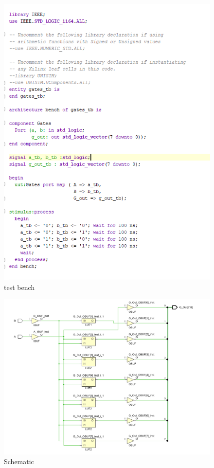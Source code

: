 \documentclass{article}
\begin{document}
\begin{figure}[h]
\begin{center}
\includegraphics[width=1\textwidth]{GatesTestSource.png} %
\caption{test bench}
\end{center}
\end{figure}

\begin{figure}[h]
\begin{center}
\includegraphics[width=1\textwidth]{GatesSchematic.png} %
\caption{Schematic}
\end{center}
\end{figure}
\end{document}
